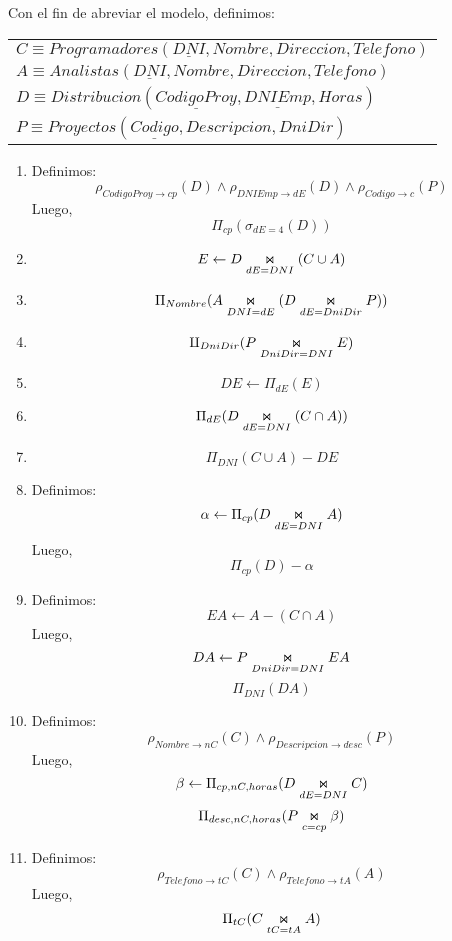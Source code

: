 Con el fin de abreviar el modelo, definimos:
\begin{center}
	\begin{tabular}{l}
		$C \equiv Programadores(\underline{DNI},Nombre, Direccion, Telefono)$\\
		$A \equiv Analistas(\underline{DNI}, Nombre, Direccion, Telefono)$\\
		$D \equiv Distribucion(\underline{CodigoProy}, \underline{DNIEmp}, Horas)$\\
		$P \equiv Proyectos(\underline{Codigo}, Descripcion, DniDir)$\\
	\end{tabular}
\end{center}

\begin{enumerate}
	
	\item Definimos:
	$$\rho_{CodigoProy \rightarrow cp}(D) \land \rho_{DNIEmp \rightarrow dE}(D) \land \rho_{Codigo\rightarrow c}(P)$$
	Luego,
	$$\Pi_{cp}(\sigma_{dE = 4} (D))$$
	
	\item 
	$$ E \leftarrow D \innerjoin[dE = DNI](C\cup A)$$
	
	\item 
	$$\Pi_{Nombre}(A \innerjoin[DNI = dE](D\innerjoin[dE = DniDir] P))$$
	
	\item 
	$$\amalg _{DniDir}(P \innerjoin[DniDir = DNI]E)$$
	
	\item 
	$$ DE \leftarrow \Pi_{dE}(E)$$
	
	\item 
	$$\Pi_{dE}(D\innerjoin[dE = DNI](C\cap A))$$
	
	\item 
	$$\Pi_{DNI}(C\cup A) - DE$$
	
	\item Definimos:
	$$ \alpha \leftarrow \Pi_{cp}(D\innerjoin[dE = DNI] A)$$
	Luego,
	$$\Pi_{cp}(D) - \alpha$$
	
	\newpage
	
	\item Definimos:
	$$EA\leftarrow A - (C\cap A)$$
	Luego,
	$$DA\leftarrow P\innerjoin[DniDir = DNI]EA$$
	$$\Pi_{DNI}(DA)$$
	
	\item Definimos:
	$$\rho_{Nombre\rightarrow nC}(C) \land \rho_{Descripcion \rightarrow desc}(P)$$
	Luego,
	$$ \beta \leftarrow \Pi_{cp, nC, horas}(D\innerjoin[dE = DNI]C)$$
	$$ \Pi_{desc, nC, horas}(P\innerjoin[c = cp]\beta)$$
	
	\item Definimos:
	$$\rho_{Telefono\rightarrow tC}(C) \land \rho_{Telefono\rightarrow tA}(A)$$
	Luego,
	$$\Pi_{tC}(C\innerjoin[tC = tA] A)$$
\end{enumerate}